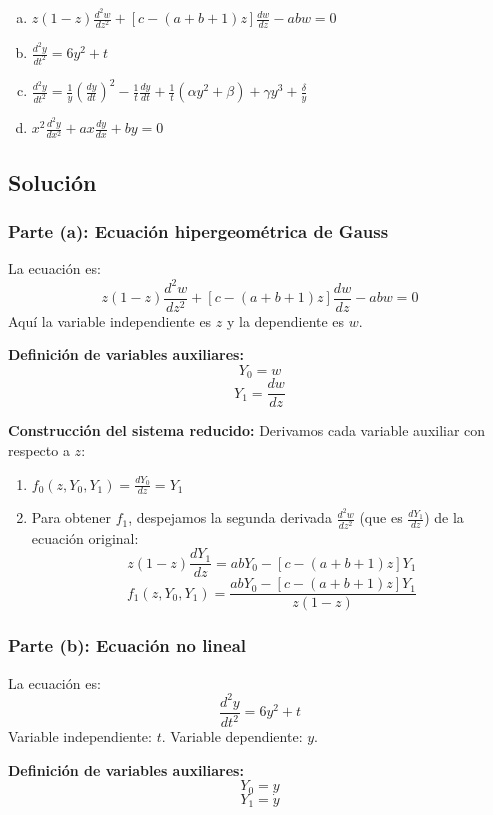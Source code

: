\documentclass[12pt, letterpaper]{article}
\begin{document}
\begin{enumerate}[a)]
    \item $z(1-z) \frac{d^2w}{dz^2} + [c - (a+b+1)z] \frac{dw}{dz} - abw = 0$
    \item $\frac{d^2y}{dt^2} = 6y^2 + t$
    \item $\frac{d^2y}{dt^2} = \frac{1}{y} \left( \frac{dy}{dt} \right)^2 - \frac{1}{t} \frac{dy}{dt} + \frac{1}{t} (\alpha y^2 + \beta) + \gamma y^3 + \frac{\delta}{y}$
    \item $x^2 \frac{d^2y}{dx^2} + ax \frac{dy}{dx} + by = 0$
\end{enumerate}

\subsection{Solución}

\subsubsection*{Parte (a): Ecuación hipergeométrica de Gauss}

La ecuación es:
$$ z(1-z) \frac{d^2w}{dz^2} + [c - (a+b+1)z] \frac{dw}{dz} - abw = 0 $$
Aquí la variable independiente es $z$ y la dependiente es $w$.

\textbf{Definición de variables auxiliares:}
$$ Y_0 = w $$
$$ Y_1 = \frac{dw}{dz} $$

\textbf{Construcción del sistema reducido:}
Derivamos cada variable auxiliar con respecto a $z$:
\begin{enumerate}
    \item $f_0(z, Y_0, Y_1) = \frac{dY_0}{dz} = Y_1$
    \item Para obtener $f_1$, despejamos la segunda derivada $\frac{d^2w}{dz^2}$ (que es $\frac{dY_1}{dz}$) de la ecuación original:
    $$ z(1-z) \frac{dY_1}{dz} = ab Y_0 - [c - (a+b+1)z] Y_1 $$
    $$ f_1(z, Y_0, Y_1) = \frac{ab Y_0 - [c - (a+b+1)z] Y_1}{z(1-z)} $$
\end{enumerate}

\subsubsection*{Parte (b): Ecuación no lineal}

La ecuación es:
$$ \frac{d^2y}{dt^2} = 6y^2 + t $$
Variable independiente: $t$. Variable dependiente: $y$.

\textbf{Definición de variables auxiliares:}
$$ Y_0 = y $$
$$ Y_1 = \dot{y} $$
\end{document}
